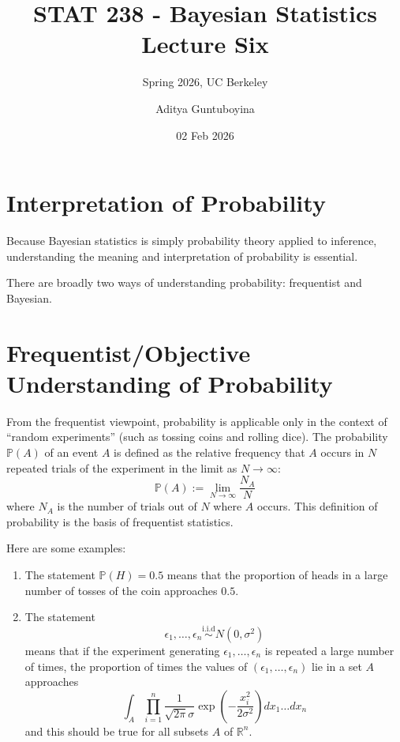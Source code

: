 \documentclass{scrartcl}
\newcommand{\R}{{\mathbb R}}
\renewcommand{\P}{{\mathbb P}}
\begin{document}
\title{STAT 238 - Bayesian Statistics  \\
  Lecture Six} 
\subtitle{Spring 2026, UC Berkeley}

\author{Aditya Guntuboyina}


\date{02 Feb 2026}

\maketitle

\section{Interpretation of Probability}
Because Bayesian statistics is simply probability theory applied to
inference, understanding the meaning and interpretation of probability
is essential. 

There are broadly two ways of understanding probability: frequentist
and Bayesian. 

\section{Frequentist/Objective Understanding of Probability}
From the frequentist viewpoint, probability is applicable only in the
context of ``random experiments'' (such as tossing coins and rolling
dice). The probability $\P(A)$ of  an event $A$ is defined as the
relative frequency that $A$ occurs in $N$ repeated trials of the
experiment in the limit as $N \rightarrow \infty$:
\begin{equation*}
  \P(A) := \lim_{N \rightarrow \infty} \frac{N_A}{N}
\end{equation*}
where $N_A$ is the number of trials out of $N$ where $A$ occurs. This
definition of probability is the basis of frequentist statistics.

Here are some examples:
\begin{enumerate}
\item The statement $\P(H) = 0.5$ means that the proportion of
  heads in a large number of tosses of the coin approaches $0.5$.
\item The statement
  \begin{equation*}
    \epsilon_1, \dots, \epsilon_n \overset{\text{i.i.d}}{\sim} N(0,
    \sigma^2)
  \end{equation*}
  means that if the experiment generating $\epsilon_1, \dots,
  \epsilon_n$ is repeated a large number of times, the proportion of
  times the values of $(\epsilon_1, \dots, \epsilon_n)$ lie in a set
  $A$ approaches
  \begin{equation*}
    \int_A \prod_{i=1}^n \frac{1}{\sqrt{2 \pi} \sigma} \exp
    \left(-\frac{x_i^2}{2 \sigma^2} \right) dx_1 \dots dx_n
  \end{equation*}
  and this should be true for all subsets $A$ of $\R^n$.
\end{enumerate}
\end{document}
